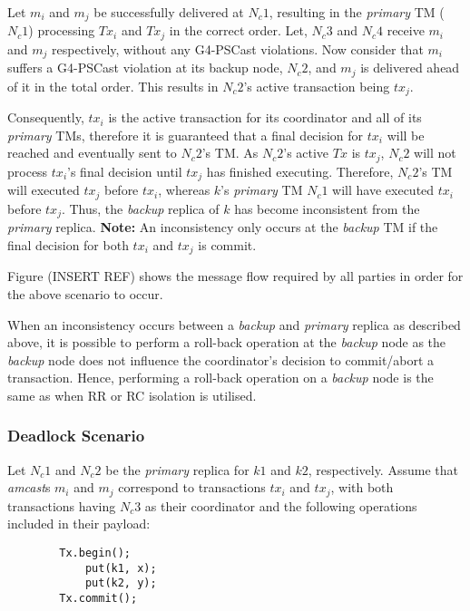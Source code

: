         Let $m_i$ and $m_j$ be successfully delivered at $N_c1$, resulting in the \emph{primary} TM ($N_c1$) processing $Tx_i$ and $Tx_j$ in the correct order.  Let, $N_c3$ and $N_c4$ receive $m_i$ and $m_j$ respectively, without any G4-PSCast violations. Now consider that $m_i$ suffers a G4-PSCast violation at its backup node, $N_c2$, and $m_j$ is delivered ahead of it in the total order.  This results in $N_c2$'s active transaction being $tx_j$.  
        
        Consequently, $tx_i$ is the active transaction for its coordinator and all of its \emph{primary} TMs, therefore it is guaranteed that a final decision for $tx_i$ will be reached and eventually sent to $N_c2$'s TM.  As $N_c2$'s active $Tx$ is $tx_j$, $N_c2$ will not process $tx_i$'s final decision until $tx_j$ has finished executing.  Therefore, $N_c2$'s TM will executed $tx_j$ before $tx_i$, whereas $k$'s \emph{primary} TM $N_c1$ will have executed $tx_i$ before $tx_j$.  Thus, the \emph{backup} replica of $k$ has become inconsistent from the \emph{primary} replica.  \textbf{Note:} An inconsistency only occurs at the \emph{backup} TM if the final decision for both $tx_i$ and $tx_j$ is commit.  
        
        Figure (INSERT REF) shows the message flow required by all parties in order for the above scenario to occur.  
        
        When an inconsistency occurs between a \emph{backup} and \emph{primary} replica as described above, it is possible to perform a roll-back operation at the \emph{backup} node as the \emph{backup} node does not influence the coordinator's decision to commit/abort a transaction.  Hence, performing a roll-back operation on a \emph{backup} node is the same as when RR or RC isolation is utilised.  
        
        
        \subsubsection*{Deadlock Scenario}
    Let $N_c1$ and $N_c2$ be the \emph{primary} replica for $k1$ and $k2$, respectively.  Assume that \emph{amcast}s $m_i$ and $m_j$ correspond to transactions $tx_i$ and $tx_j$, with both transactions having $N_c3$ as their coordinator and the following operations included in their payload: 
    
    \begin{lstlisting}
	    Tx.begin();
		    put(k1, x);
		    put(k2, y);
		Tx.commit();
    \end{lstlisting}
    
